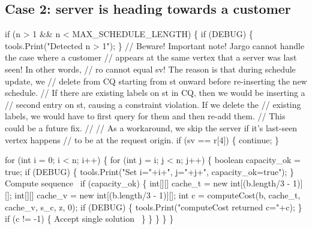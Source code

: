 \documentclass{article}
\def\nwendcode{\endtrivlist \endgroup}      %
\let\nwdocspar=\par
\begin{document}
\subsection{Case 2: server is heading towards a customer}
\nwenddocs{}\endmoddef{}
if (n > 1 && n < MAX_SCHEDULE_LENGTH) \{
  if (DEBUG) \{
    tools.Print("Detected n > 1");
  \}
  // Beware! Important note! Jargo cannot handle the case where a customer
  // appears at the same vertex that a server was last seen! In other words,
  // ro cannot equal sv! The reason is that during schedule update, we
  // delete from CQ starting from st onward before re-inserting the new schedule.
  // If there are existing labels on st in CQ, then we would be inserting a
  // second entry on st, causing a constraint violation. If we delete the
  // existing labels, we would have to first query for them and then re-add them.
  // This could be a future fix.
  //
  // As a workaround, we skip the server if it's last-seen vertex happens
  // to be at the request origin.
  if (sv == r[4]) \{
    continue;
  \}

  for (int i = 0; i < n; i++) \{
    for (int j = i; j < n; j++) \{
      boolean capacity_ok = true;
      if (DEBUG) \{
        tools.Print("Set i="+i+", j="+j+", capacity_ok=true");
      \}
      \LA{}Compute sequence~{\nwtagstyle{}}\RA{}
      if (capacity_ok) \{
        int[][] cache_t = new int[(b.length/3 - 1)][];
        int[][] cache_v = new int[(b.length/3 - 1)][];
        int c = computeCost(b, cache_t, cache_v, s_c, z, 0);
        if (DEBUG) \{
          tools.Print("computeCost returned c="+c);
        \}
        if (c != -1) \{
          \LA{}Accept single solution~{\nwtagstyle{}}\RA{}
        \}
      \}
    \}
  \}
\}
\nwendcode{}\nwdocspar
\end{document}
